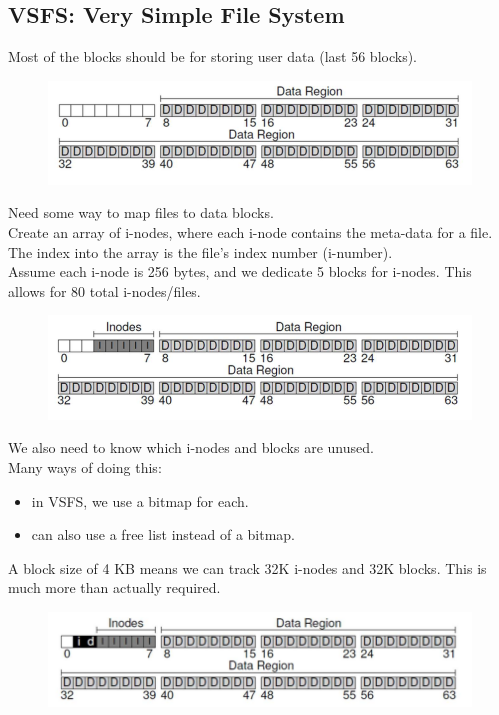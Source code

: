 \documentclass[12pt]{article}
\theoremstyle{plain}
\theoremstyle{definition}
\begin{document}
\subsection{VSFS: Very Simple File System}
Most of the blocks should be for storing user data (last 56 blocks).
\begin{figure}[H]
  \centering
  \includegraphics[scale=0.8]{pictures/vsfs_1.png}
\end{figure}

Need some way to map files to data blocks. \\

Create an array of i-nodes, where each i-node contains the meta-data for a file. \\
The index into the array is the file's index number (i-number). \\

Assume each i-node is 256 bytes, and we dedicate 5 blocks for i-nodes.
This allows for 80 total i-nodes/files.

\begin{figure}[H]
  \centering
  \includegraphics[scale=0.8]{pictures/vsfs_2.png}
\end{figure}

We also need to know which i-nodes and blocks are unused. \\
Many ways of doing this:
\begin{itemize}
  \item in VSFS, we use a bitmap for each.
  \item can also use a free list instead of a bitmap.
\end{itemize}

A block size of 4 KB means we can track 32K i-nodes and 32K blocks.
This is much more than actually required.
\begin{figure}[H]
  \centering
  \includegraphics[scale=0.8]{pictures/vsfs_3.png}
\end{figure}
\end{document}

